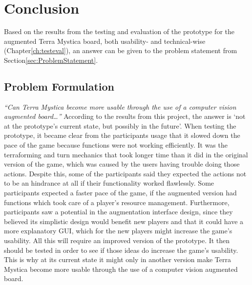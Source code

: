 \chapter{Conclusion}\label{ch:conclusion}
Based on the results from the testing and evaluation of the prototype for the augmented Terra Mystica board, both usability- and technical-wise (Chapter\ref{ch:testeval}), an answer can be given to the problem statement from Section\ref{sec:ProblemStatement}.

\section{Problem Formulation}
\textit{“Can Terra Mystica become more usable through the use of a computer vision augmented board…”} According to the results from this project, the answer is ‘not at the prototype’s current state, but possibly in the future’. When testing the prototype, it became clear from the participants usage that it slowed down the pace of the game because functions were not working efficiently. It was the terraforming and turn mechanics that took longer time than it did in the original version of the game, which was caused by the users having trouble doing those actions. Despite this, some of the participants said they expected the actions not to be an hindrance at all if their functionality worked flawlessly. Some participants expected a faster pace of the game, if the augmented version had functions which took care of a player’s resource management. Furthermore, participants saw a potential in the augmentation interface design, since they believed its simplistic design would benefit new players and that it could have a more explanatory GUI, which for the new players might increase the game’s usability. All this will require an improved version of the prototype. It then should be tested in order to see if those ideas do increase the game’s usability. This is why at its current state it might only in another version make Terra Mystica become more usable through the use of a computer vision augmented board.

